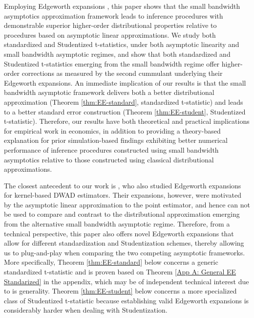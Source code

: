 \documentclass[11pt]{article}
\numberwithin{equation}{section}
\theoremstyle{definition}
\begin{document}
Employing Edgeworth expansions \citep{Bhattacharya-Rao1976_book,Hall1992_book}, this paper shows that the small bandwidth asymptotics approximation framework leads to inference procedures with demonstrable superior higher-order distributional properties relative to procedures based on asymptotic linear approximations. We study both standardized and Studentized t-statistics, under both asymptotic linearity and small bandwidth asymptotic regimes, and show that both standardized and Studentized t-statistics emerging from the small bandwidth regime offer higher-order corrections as measured by the second cummulant underlying their Edgeworth expansions. An immediate implication of our results is that the small bandwidth asymptotic framework delivers both a better distributional approximation (Theorem \ref{thm:EE-standard}, standardized t-statistic) and leads to a better standard error construction (Theorem \ref{thm:EE-student}, Studentized t-statistic). Therefore, our results have both theoretical and practical implications for empirical work in economics, in addition to providing a theory-based explanation for prior simulation-based findings exhibiting better numerical performance of inference procedures constructed using small bandwidth asymptotics relative to those constructed using classical distributional approximations.

The closest antecedent to our work is \citet{Nishiyama-Robinson_2000_ECMA,Nishiyama-Robinson_2001_ChBook}, who also studied Edgeworth expansions for kernel-based DWAD estimators. Their expansions, however, were motivated by the asymptotic linear approximation to the point estimator, and hence can not be used to compare and contrast to the distributional approximation emerging from the alternative small bandwidth asymptotic regime. Therefore, from a technical perspective, this paper also offers novel Edgeworth expansions that allow for different standardization and Studentization schemes, thereby allowing us to plug-and-play when comparing the two competing asymptotic frameworks. More specifically, Theorem \ref{thm:EE-standard} below concerns a generic standardized t-statistic and is proven based on Theorem \ref{App A: General EE Standarized} in the appendix, which may be of independent technical interest due to is generality. Theorem \ref{thm:EE-student} below concerns a more specialized class of Studentized t-statistic because establishing valid Edgeworth expansions is considerably harder when dealing with Studentization.
\end{document}
